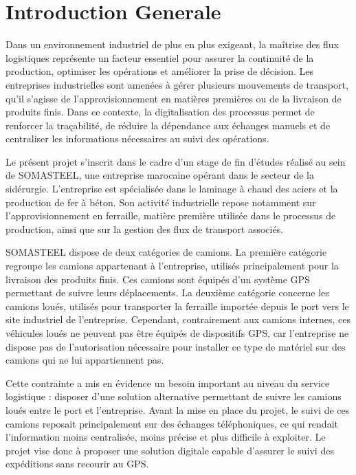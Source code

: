 \chapter*{Introduction Generale}
{}


Dans un environnement industriel de plus en plus exigeant, la maîtrise des flux logistiques représente un facteur essentiel pour assurer la continuité de la production, optimiser les opérations et améliorer la prise de décision. Les entreprises industrielles sont amenées à gérer plusieurs mouvements de transport, qu'il s'agisse de l'approvisionnement en matières premières ou de la livraison de produits finis. Dans ce contexte, la digitalisation des processus permet de renforcer la traçabilité, de réduire la dépendance aux échanges manuels et de centraliser les informations nécessaires au suivi des opérations.

Le présent projet s'inscrit dans le cadre d'un stage de fin d'études réalisé au sein de SOMASTEEL, une entreprise marocaine opérant dans le secteur de la sidérurgie. L'entreprise est spécialisée dans le laminage à chaud des aciers et la production de fer à béton. Son activité industrielle repose notamment sur l'approvisionnement en ferraille, matière première utilisée dans le processus de production, ainsi que sur la gestion des flux de transport associés.

SOMASTEEL dispose de deux catégories de camions. La première catégorie regroupe les camions appartenant à l'entreprise, utilisés principalement pour la livraison des produits finis. Ces camions sont équipés d'un système GPS permettant de suivre leurs déplacements. La deuxième catégorie concerne les camions loués, utilisés pour transporter la ferraille importée depuis le port vers le site industriel de l'entreprise. Cependant, contrairement aux camions internes, ces véhicules loués ne peuvent pas être équipés de dispositifs GPS, car l'entreprise ne dispose pas de l'autorisation nécessaire pour installer ce type de matériel sur des camions qui ne lui appartiennent pas.

Cette contrainte a mis en évidence un besoin important au niveau du service logistique : disposer d'une solution alternative permettant de suivre les camions loués entre le port et l'entreprise. Avant la mise en place du projet, le suivi de ces camions reposait principalement sur des échanges téléphoniques, ce qui rendait l'information moins centralisée, moins précise et plus difficile à exploiter. Le projet vise donc à proposer une solution digitale capable d'assurer le suivi des expéditions sans recourir au GPS.


